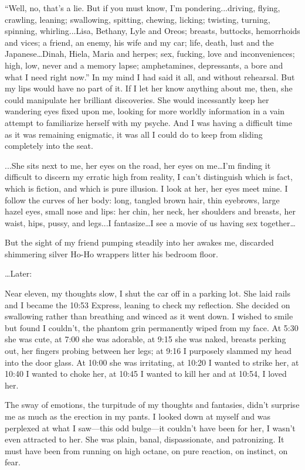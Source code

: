 \documentclass[
]{article}
\begin{document}
``Well, no, that's a lie. But if you must know, I'm pondering...driving,
flying, crawling, leaning; swallowing, spitting, chewing, licking;
twisting, turning, spinning, whirling...Lisa, Bethany, Lyle and Oreos;
breasts, buttocks, hemorrhoids and vices; a friend, an enemy, his wife
and my car; life, death, lust and the Japanese\ldots Dinah, Hiela, Maria
and herpes; sex, fucking, love and inconveniences; high, low, never and
a memory lapse; amphetamines, depressants, a bore and what I need right
now.'' In my mind I had said it all, and without rehearsal. But my lips
would have no part of it. If I let her know anything about me, then, she
could manipulate her brilliant discoveries. She would incessantly keep
her wandering eyes fixed upon me, looking for more worldly information
in a vain attempt to familiarize herself with my psyche. And I was
having a difficult time as it was remaining enigmatic, it was all I
could do to keep from sliding completely into the seat.

...She sits next to me, her eyes on the road, her eyes on me\ldots I'm
finding it difficult to discern my erratic high from reality, I can't
distinguish which is fact, which is fiction, and which is pure illusion.
I look at her, her eyes meet mine. I follow the curves of her body:
long, tangled brown hair, thin eyebrows, large hazel eyes, small nose
and lips: her chin, her neck, her shoulders and breasts, her waist,
hips, pussy, and legs...I fantasize\ldots I see a movie of us having sex
together\ldots{}

But the sight of my friend pumping steadily into her awakes me,
discarded shimmering silver Ho-Ho wrappers litter his bedroom floor.

\ldots Later:

Near eleven, my thoughts slow, I shut the car off in a parking lot. She
laid rails and I became the 10:53 Express, leaning to check my
reflection. She decided on swallowing rather than breathing and winced
as it went down. I wished to smile but found I couldn't, the phantom
grin permanently wiped from my face. At 5:30 she was cute, at 7:00 she
was adorable, at 9:15 she was naked, breasts perking out, her fingers
probing between her legs; at 9:16 I purposely slammed my head into the
door glass. At 10:00 she was irritating, at 10:20 I wanted to strike
her, at 10:40 I wanted to choke her, at 10:45 I wanted to kill her and
at 10:54, I loved her.

The sway of emotions, the turpitude of my thoughts and fantasies, didn't
surprise me as much as the erection in my pants. I looked down at myself
and was perplexed at what I saw---this odd bulge---it couldn't have been
for her, I wasn't even attracted to her. She was plain, banal,
dispassionate, and patronizing. It must have been from running on high
octane, on pure reaction, on instinct, on fear.
\end{document}
